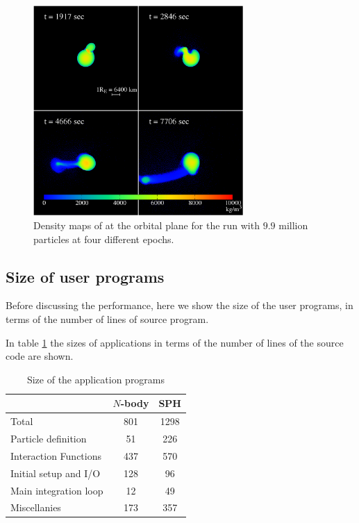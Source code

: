 \documentclass[dvipdfmx]{acm_proc_article-sp}
\begin{document}
\begin{figure}
  \begin{center}
    \includegraphics[width=8cm,bb=0 0 1024 1024]{gb.png}
  \end{center}
  \caption{Density maps of at the orbital plane for the run with
  $9.9$ million particles at four different epochs.
  }
  \label{fig:viewGI}
\end{figure}

\subsection{Size of user programs}
\label{sect:userprograms}

Before discussing the performance, 
here we show the size of the user
programs, in terms of the number of lines of source program.

In table \ref{tab:applicationsize} the sizes of applications in terms
of the number of lines of the source code are shown.

\begin{table}
  \begin{center}
  \caption{Size of the application programs}
  \label{tab:applicationsize}
  \begin{tabular}{lcc}
    \hline
      & $N$-body & SPH\\
    \hline
    Total & 801 & 1298 \\
    Particle definition &  51 & 226 \\
    Interaction Functions &  437 & 570 \\
    Initial setup and I/O &  128 & 96 \\
    Main integration loop &  12 & 49 \\
    Miscellanies & 173 & 357\\
\hline    
  \end{tabular}
  \end{center}
\end{table}
\end{document}

